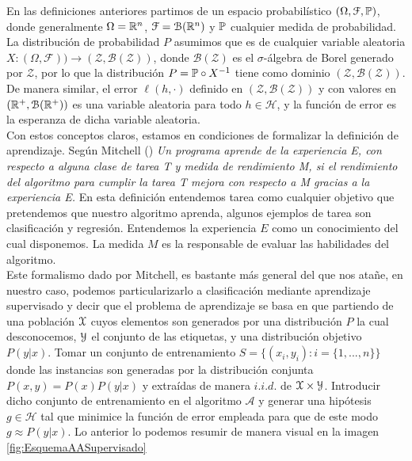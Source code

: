     En las definiciones anteriores partimos de un espacio probabilístico $(\Omega,\mathcal{F},\mathbb{P})$, donde generalmente $\Omega = \mathbb{R}^n$, $\mathcal{F} = \mathcal{B}(\mathbb{R}^n)$ y  $\mathbb{P}$ cualquier medida de probabilidad. La distribución de probabilidad $P$ asumimos que es de cualquier variable aleatoria $X:(\Omega, \mathcal{F})) \to (\mathcal{Z}, \mathcal{B}(\mathcal{Z}))$, donde $\mathcal{B}(\mathcal{Z})$ es el $\sigma$-álgebra de Borel generado por $\mathcal{Z}$, por lo que la distribución $P = \mathbb{P} \circ X^{-1}$ tiene como dominio $(\mathcal{Z}, \mathcal{B}(\mathcal{Z}))$. De manera similar, el error $\ell(h,\cdot)$ definido en $(\mathcal{Z}, \mathcal{B}(\mathcal{Z}))$ y con valores en $(\mathbb{R}^+,\mathcal{B}(\mathbb{R}^+))$ es una variable aleatoria para todo $h \in \mathcal{H}$, y la función de error es la esperanza de dicha variable aleatoria. \\
    

    Con estos conceptos claros, estamos en condiciones de formalizar la definición de aprendizaje. Según Mitchell  (\cite{M.Mitchell}) \textit{Un programa aprende de la experiencia E, con respecto a alguna clase de tarea T y medida de rendimiento M, si el rendimiento del algoritmo para cumplir la tarea T mejora con respecto a M gracias a la experiencia E.} En esta definición entendemos tarea como cualquier objetivo que pretendemos que nuestro algoritmo aprenda, algunos ejemplos de tarea son clasificación y regresión. Entendemos la experiencia $E$ como un conocimiento del cual disponemos. La medida $M$ es la responsable de evaluar las habilidades del algoritmo. \\
    
    Este formalismo dado por Mitchell, es bastante más general del que nos atañe, en nuestro caso, podemos particularizarlo a clasificación mediante aprendizaje supervisado y decir que el problema de aprendizaje se basa en que partiendo de una población $\mathcal{X}$ cuyos elementos son generados por una distribución $P$ la cual desconocemos, $\mathcal{Y}$ el conjunto de las etiquetas, y una distribución objetivo $P(y|x)$. Tomar un conjunto de entrenamiento $S=\{(x_i,y_i) : i = \{1,...,n\}\}$ donde las instancias son generadas por la distribución conjunta $P(x,y) = P(x)P(y|x)$ y extraídas de manera $i.i.d.$ de $\mathcal{X} \times \mathcal{Y}$. Introducir dicho conjunto de entrenamiento en el algoritmo $\mathcal{A}$ y generar una hipótesis $g \in \mathcal{H}$ tal que minimice la función de error empleada para que de este modo $g \approx P(y|x)$. Lo anterior lo podemos resumir de manera visual en la imagen \ref{fig:EsquemaAASupervisado}
    
